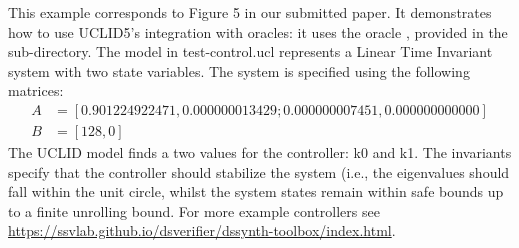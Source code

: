 This example corresponds to Figure 5 in our submitted paper. It demonstrates how to use
UCLID5's integration with oracles: 
it uses the oracle , provided in the 
 sub-directory.
The model in test-control.ucl represents a Linear Time Invariant system with two state variables. The system is specified using the following matrices:
\begin{align*}
    A &= [0.901224922471, 0.000000013429; 0.000000007451, 0.000000000000] \\
    B &= [128, 0]
\end{align*}
The UCLID model finds a two values for the controller: k0 and k1.
The invariants specify that the controller should stabilize the system (i.e., the eigenvalues should fall within the unit circle, whilst the system states remain within safe bounds up to a finite unrolling bound. 
For more example controllers see \url{https://ssvlab.github.io/dsverifier/dssynth-toolbox/index.html}. 